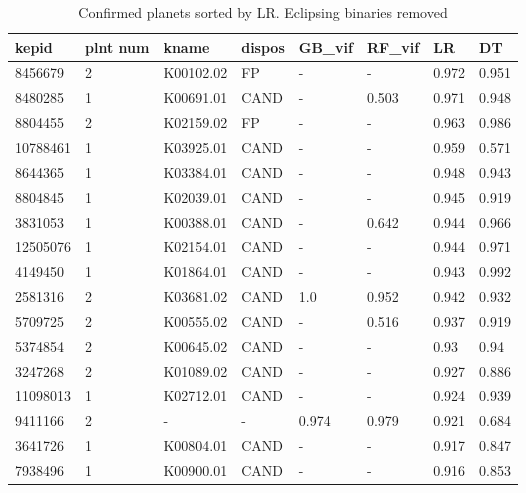 \begin{table}[!htbp]
 \centering
 \caption{Confirmed planets sorted by LR. Eclipsing binaries removed}
 \label{dataGBvifRFvifLRDTtab} 
  \begin{tabular}
{| 
 p{}| 
 p{}| 
 p{}| 
 p{}| 
 p{}| 
 p{}| 
 p{}| 
 p{}| 
}\hline 
\textbf{kepid} &\textbf{plnt num} &\textbf{kname} &\textbf{dispos} &\textbf{GB\_vif} &\textbf{RF\_vif} &\textbf{LR} &\textbf{DT} \\ \hline 
8456679 &2 &K00102.02 &FP &- &- &0.972 &0.951 \\ \hline 
8480285 &1 &K00691.01 &CAND &- &0.503 &0.971 &0.948 \\ \hline 
8804455 &2 &K02159.02 &FP &- &- &0.963 &0.986 \\ \hline 
10788461 &1 &K03925.01 &CAND &- &- &0.959 &0.571 \\ \hline 
8644365 &1 &K03384.01 &CAND &- &- &0.948 &0.943 \\ \hline 
8804845 &1 &K02039.01 &CAND &- &- &0.945 &0.919 \\ \hline 
3831053 &1 &K00388.01 &CAND &- &0.642 &0.944 &0.966 \\ \hline 
12505076 &1 &K02154.01 &CAND &- &- &0.944 &0.971 \\ \hline 
4149450 &1 &K01864.01 &CAND &- &- &0.943 &0.992 \\ \hline 
2581316 &2 &K03681.02 &CAND &1.0 &0.952 &0.942 &0.932 \\ \hline 
5709725 &2 &K00555.02 &CAND &- &0.516 &0.937 &0.919 \\ \hline 
5374854 &2 &K00645.02 &CAND &- &- &0.93 &0.94 \\ \hline 
3247268 &2 &K01089.02 &CAND &- &- &0.927 &0.886 \\ \hline 
11098013 &1 &K02712.01 &CAND &- &- &0.924 &0.939 \\ \hline 
9411166 &2 &- &- &0.974 &0.979 &0.921 &0.684 \\ \hline 
3641726 &1 &K00804.01 &CAND &- &- &0.917 &0.847 \\ \hline 
7938496 &1 &K00900.01 &CAND &- &- &0.916 &0.853 \\ \hline 

\end{tabular}
\end{table}
